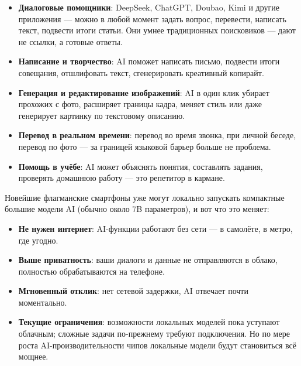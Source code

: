 
\begin{itemize}
  \item \textbf{Диалоговые помощники}: DeepSeek, ChatGPT, Doubao, Kimi и другие приложения — можно в любой момент задать вопрос, перевести, написать текст, подвести итоги статьи. Они умнее традиционных поисковиков — дают не ссылки, а готовые ответы.
  \item \textbf{Написание и творчество}: AI поможет написать письмо, подвести итоги совещания, отшлифовать текст, сгенерировать креативный копирайт.
  \item \textbf{Генерация и редактирование изображений}: AI в один клик убирает прохожих с фото, расширяет границы кадра, меняет стиль или даже генерирует картинку по текстовому описанию.
  \item \textbf{Перевод в реальном времени}: перевод во время звонка, при личной беседе, перевод по фото — за границей языковой барьер больше не проблема.
  \item \textbf{Помощь в учёбе}: AI может объяснять понятия, составлять задания, проверять домашнюю работу — это репетитор в кармане.
\end{itemize}


Новейшие флагманские смартфоны уже могут локально запускать компактные большие модели AI (обычно около 7B параметров), и вот что это меняет:

\begin{itemize}
  \item \textbf{Не нужен интернет}: AI-функции работают без сети — в самолёте, в метро, где угодно.
  \item \textbf{Выше приватность}: ваши диалоги и данные не отправляются в облако, полностью обрабатываются на телефоне.
  \item \textbf{Мгновенный отклик}: нет сетевой задержки, AI отвечает почти моментально.
  \item \textbf{Текущие ограничения}: возможности локальных моделей пока уступают облачным; сложные задачи по-прежнему требуют подключения. Но по мере роста AI-производительности чипов локальные модели будут становиться всё мощнее.
\end{itemize}


